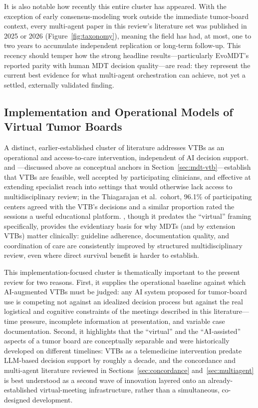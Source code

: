 \documentclass[acmsmall,screen=true,review=false,nonacm=true]{acmart}
\begin{document}
It is also notable how recently this entire cluster has appeared. With the exception of early consensus-modeling work outside the immediate tumor-board context, every multi-agent paper in this review's literature set was published in 2025 or 2026 (Figure~\ref{fig:taxonomy}), meaning the field has had, at most, one to two years to accumulate independent replication or long-term follow-up. This recency should temper how the strong headline results---particularly EvoMDT's reported parity with human MDT decision quality---are read: they represent the current best evidence for what multi-agent orchestration can achieve, not yet a settled, externally validated finding.

\subsection{Implementation and Operational Models of Virtual Tumor Boards}
\label{sec:implementation}

A distinct, earlier-established cluster of literature addresses VTBs as an operational and access-to-care intervention, independent of AI decision support. \citet{marshall2014} and \citet{thiagarajan2023}---discussed above as conceptual anchors in Section~\ref{sec:mdt-vtb}---establish that VTBs are feasible, well accepted by participating clinicians, and effective at extending specialist reach into settings that would otherwise lack access to multidisciplinary review; in the Thiagarajan et al.\ cohort, 96.1\% of participating centers agreed with the VTB's decisions and a similar proportion rated the sessions a useful educational platform. \citet{patkar2011}, though it predates the ``virtual'' framing specifically, provides the evidentiary basis for why MDTs (and by extension VTBs) matter clinically: guideline adherence, documentation quality, and coordination of care are consistently improved by structured multidisciplinary review, even where direct survival benefit is harder to establish.

This implementation-focused cluster is thematically important to the present review for two reasons. First, it supplies the operational baseline against which AI-augmented VTBs must be judged: any AI system proposed for tumor-board use is competing not against an idealized decision process but against the real logistical and cognitive constraints of the meetings described in this literature---time pressure, incomplete information at presentation, and variable case documentation. Second, it highlights that the ``virtual'' and the ``AI-assisted'' aspects of a tumor board are conceptually separable and were historically developed on different timelines: VTBs as a telemedicine intervention predate LLM-based decision support by roughly a decade, and the concordance and multi-agent literature reviewed in Sections~\ref{sec:concordance} and~\ref{sec:multiagent} is best understood as a second wave of innovation layered onto an already-established virtual-meeting infrastructure, rather than a simultaneous, co-designed development.
\end{document}
